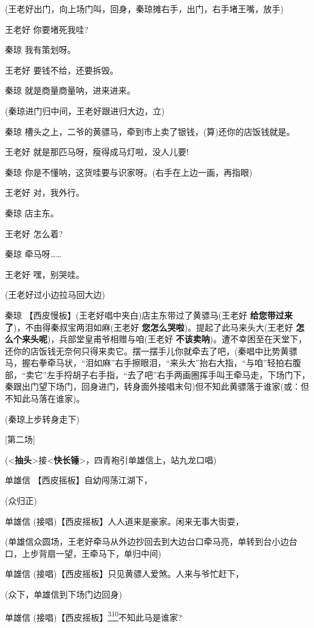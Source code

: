 (王老好出门，向上场门叫，回身，秦琼摊右手，出门，右手堵王嘴，放手)

王老好 你要堵死我哇?

秦琼 我有策划呀。

王老好 要钱不给，还要拆毁。

秦琼 就是商量商量呐，进来进来。

(秦琼进门归中间，王老好跟进归大边，立)

秦琼 槽头之上，二爷的黄骠马，牵到市上卖了银钱，(算)还你的店饭钱就是。

王老好 就是那匹马呀，瘦得成马灯啦，没人儿要!

秦琼 你是不懂呐，这货哇要与识家呀。(右手在上边一画，再指眼)

王老好 对，我外行。

秦琼 店主东。

王老好 怎么着?

秦琼 牵马呀\ldots{}\ldots{}

王老好 嘿，别哭哇。

(王老好过小边拉马回大边)

秦琼 【西皮慢板】(王老好唱中夹白)店主东带过了黄骠马(王老好
\textbf{给您带过来了})，不由得秦叔宝两泪如麻(王老好
\textbf{您怎么哭啦})。提起了此马来头大(王老好
\textbf{怎么个来头呢})，兵部堂皇甫爷相赠与咱(王老好
\textbf{不该卖呐})。遭不幸困至在天堂下，还你的店饭钱无奈何只得来卖它。摆一摆手儿你就牵去了吧，(秦唱中比势黄骠马，握右拳牵马状，``泪如麻''右手擦眼泪，``来头大''抬右大指，``与咱''轻拍右腹部，``卖它''左手捋胡子右手指，``去了吧''右手两画圈挥手叫王牵马走，下场门下，秦跟出门望下场门，回身进门，转身面外接唱末句)但不知此黄骠落于谁家(或：但不知此马落在谁家)。

(秦琼上步转身走下)

{[}第二场{]}

(\textless{}\textbf{抽头}\textgreater{}接\textless{}\textbf{快长锤}\textgreater{}，四青袍引单雄信上，站九龙口唱)

单雄信 【西皮摇板】自幼闯荡江湖下，

(众归正)

单雄信 (接唱)【西皮摇板】人人道来是豪家。闲来无事大街耍，

(单雄信众圆场，王老好牵马从外边抄回去到大边台口牵马亮，单转到台小边台口，上步背扇一望，王牵马下，单归中间)

单雄信 (接唱)【西皮摇板】只见黄骠人爱煞。人来与爷忙赶下，

(众下，单雄信到下场门边回身)

单雄信
(接唱)【西皮摇板】\protect\hyperlink{fn310}{\textsuperscript{310}}不知此马是谁家?

